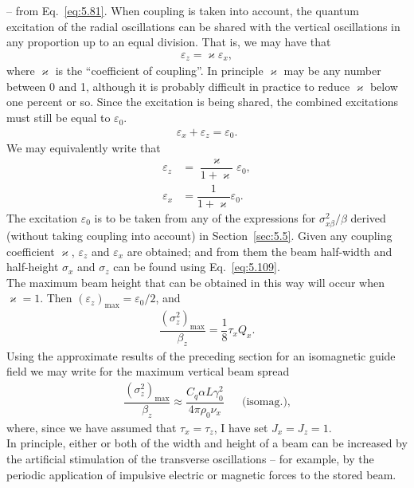 -- from Eq.~\eqref{eq:5.81}. When coupling is taken into account, the quantum excitation of the radial oscillations can be shared with the vertical oscillations in any proportion up to an equal division. That is, we may have that
\begin{align}
	\varepsilon_z = \varkappa \varepsilon_x,
\end{align}
where $\varkappa$ is the ``coefficient of coupling''. In principle $\varkappa$ may be any number between
0 and 1, although it is probably difficult in practice to reduce $\varkappa$ below one percent or so. Since the excitation is being shared, the combined excitations must still be equal to $\varepsilon_0$.
\begin{align}
	\varepsilon_x + \varepsilon_z = \varepsilon_0.
\end{align}
We may equivalently write that
\begin{align}
	\varepsilon_z &= \dfrac{\varkappa}{1+\varkappa}\varepsilon_0,\\
    \varepsilon_x &= \dfrac{1}{1+\varkappa}\varepsilon_0.
\end{align}
The excitation $\varepsilon_0$ is to be taken from any of the expressions for $\sigma_{x\beta}^2/\beta$ derived (without taking coupling into account) in Section~\ref{sec:5.5}. Given any coupling coefficient $\varkappa$, $\varepsilon_z$ and $\varepsilon_x$ are obtained; and from them the beam half-width and half-height $\sigma_x$ and $\sigma_z$ can be found using Eq.~\eqref{eq:5.109}.\\
The maximum beam height that can be obtained in this way will occur when $\varkappa = 1$. Then $(\varepsilon_z)_\text{max} = \varepsilon_0/2$, and
\begin{align}
	\dfrac{(\sigma_z^2)_\text{max}}{\beta_z} = \dfrac{1}{8} \tau_x Q_x.
\end{align}
Using the approximate results of the preceding section for an isomagnetic guide field we may write for the maximum vertical beam spread
\begin{align}
	\dfrac{(\sigma_z^2)_\text{max}}{\beta_z} \approx \dfrac{C_q \alpha L \gamma_0^2}{4\pi\rho_0\nu_x} && \text{(isomag.)},
\end{align}
where, since we have assumed that $\tau_x = \tau_z$, I have set $J_x = J_z = 1$.\\
In principle, either or both of the width and height of a beam can be increased by the artificial stimulation of the transverse oscillations -- for example, by the periodic application of impulsive electric or magnetic forces to the stored beam.
